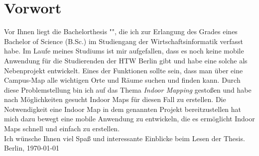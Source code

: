 \chapter*{Vorwort}
Vor Ihnen liegt die Bachelorthesis "\thetitle", die ich zur Erlangung des Grades eines Bachelor of Science (B.Sc.) im Studiengang der Wirtschaftsinformatik verfasst habe.
\pbreak
Im Laufe meines Studiums ist mir aufgefallen, dass es noch keine mobile Anwendung für die Studierenden der HTW Berlin gibt und habe eine solche als Nebenprojekt entwickelt. Eines der Funktionen sollte sein, dass man über eine Campus-Map alle wichtigen Orte und Räume suchen und finden kann. Durch diese Problemstellung bin ich auf das Thema \textit{Indoor Mapping} gestoßen und habe nach Möglichkeiten gesucht Indoor Maps für diesen Fall zu erstellen. Die Notwendigkeit eine Indoor Map in dem genannten Projekt bereitzustellen hat mich dazu bewegt eine mobile Anwendung zu entwickeln, die es ermöglicht Indoor Maps schnell und einfach zu erstellen.\\[1em]

Ich wünsche Ihnen viel Spaß und interessante Einblicke beim Lesen der Thesis.
\pbreak
\theauthor
\pbreak
Berlin, \today
\clearpage
